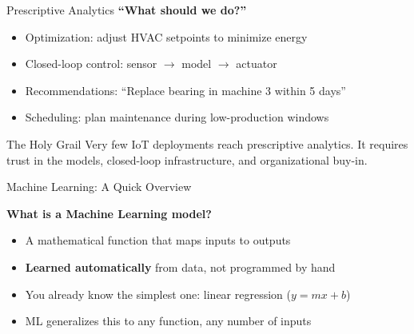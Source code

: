 \documentclass[aspectratio=169,11pt]{beamer}
\begin{document}
\begin{frame}{Prescriptive Analytics}
    \textbf{``What should we do?''}
    \begin{itemize}
        \item Optimization: adjust HVAC setpoints to minimize energy
        \item Closed-loop control: sensor $\rightarrow$ model $\rightarrow$ actuator
        \item Recommendations: ``Replace bearing in machine 3 within 5 days''
        \item Scheduling: plan maintenance during low-production windows
    \end{itemize}

    \vspace{0.3cm}
    \begin{alertblock}{The Holy Grail}
        Very few IoT deployments reach prescriptive analytics. It requires trust in the models, closed-loop infrastructure, and organizational buy-in.
    \end{alertblock}
\end{frame}


\begin{frame}{Machine Learning: A Quick Overview}
    \begin{center}
        \Large
        \textbf{What is a Machine Learning model?}
    \end{center}

    \vspace{0.5cm}
    \begin{itemize}
        \item A mathematical function that maps inputs to outputs
        \item \textbf{Learned automatically} from data, not programmed by hand
        \item You already know the simplest one: linear regression ($y = mx + b$)
        \item ML generalizes this to any function, any number of inputs
    \end{itemize}
\end{frame}
\end{document}
